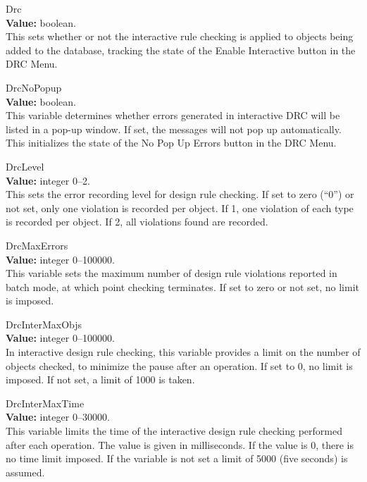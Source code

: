 \begin{description}

\item{\et Drc}\\
{\bf Value:} boolean.\\
This sets whether or not the interactive rule checking is applied to
objects being added to the database, tracking the state of the {\cb
Enable Interactive} button in the {\cb DRC Menu}.

\item{\et DrcNoPopup}\\
{\bf Value:} boolean.\\
This variable determines whether errors generated in interactive DRC
will be listed in a pop-up window.  If set, the messages will not pop
up automatically.  This initializes the state of the {\cb No Pop Up
Errors} button in the {\cb DRC Menu}.

\item{\et DrcLevel}\\
{\bf Value:} integer 0--2.\\
This sets the error recording level for design rule checking.  If set
to zero (``0'') or not set, only one violation is recorded per object. 
If 1, one violation of each type is recorded per object.  If 2, all
violations found are recorded.

\item{\vt DrcMaxErrors}\\
{\bf Value:} integer 0--100000.\\
This variable sets the maximum number of design rule violations
reported in batch mode, at which point checking terminates.  If set to
zero or not set, no limit is imposed.

\item{\et DrcInterMaxObjs}\\
{\bf Value:} integer 0--100000.\\
In interactive design rule checking, this variable provides a limit on
the number of objects checked, to minimize the pause after an
operation.  If set to 0, no limit is imposed.  If not set, a limit of
1000 is taken.

\item{\et DrcInterMaxTime}\\
{\bf Value:} integer 0--30000.\\
This variable limits the time of the interactive design rule checking
performed after each operation.  The value is given in milliseconds. 
If the value is 0, there is no time limit imposed.  If the variable
is not set a limit of 5000 (five seconds) is assumed.


\end{description}
